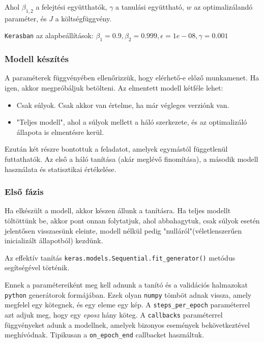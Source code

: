 \noindent
Ahol $ \beta_{1,2} $ a felejtési együtthatók, $ \gamma $ a tanulási együttható,
$ w $ az optimalizálandó paraméter, és $ J $ a költségfüggvény.

\noindent
\texttt{Kerasban} az alapbeállítások: 
$ \beta_1=0.9, \beta_2=0.999, \epsilon=1e-08, \gamma=0.001 $



\subsubsection{Modell készítés}

A paraméterek függvényében ellenőrizzük, hogy elérhető-e előző munkamenet.
Ha igen, akkor megpróbáljuk betölteni. Az elmentett modell kétféle lehet:

\begin{itemize}
	\item 
	Csak súlyok. Csak akkor van értelme, ha már végleges verziónk van.
	\item 
	"Teljes modell", ahol a súlyok mellett a háló szerkezete, és az optimalizáló állapota
	is elmentésre kerül.
\end{itemize}



Ezután két részre bontottuk a feladatot, amelyek egymástól függetlenül futtathatók.
Az első a háló tanítása (akár meglévő finomítása), a második modell használata 
és statisztikai értékelése.


\subsubsection{Első fázis}

Ha elkészült a modell, akkor készen állunk a tanításra. Ha teljes modellt töltöttünk be,
akkor pont onnan folytatjuk, ahol abbahagytuk, csak súlyok esetén jelentősen visszaesünk 
eleinte, modell nélkül pedig "nulláról"(véletlenszerűen inicializált állapotból) kezdünk.

Az effektív tanítás \texttt{keras.models.Sequential.fit\_generator()} metódus segítségével 
történik.

Ennek a paramétereiként meg kell adnunk a tanító és a validációs halmazokat \texttt{python} 
generátorok formájában. Ezek olyan \texttt{numpy} tömböt adnak vissza, amely megfelel 
egy kötegnek, és egy eleme egy kép. A \texttt{steps\_per\_epoch} paraméterrel azt adjuk
meg, hogy egy \textit{eposz} hány köteg. A \texttt{callbacks} paraméterrel függvényeket
adunk a modellnek, amelyek bizonyos események bekövetkeztével meghívódnak. Tipikusan a
\texttt{on\_epoch\_end} callbacket használtuk.

